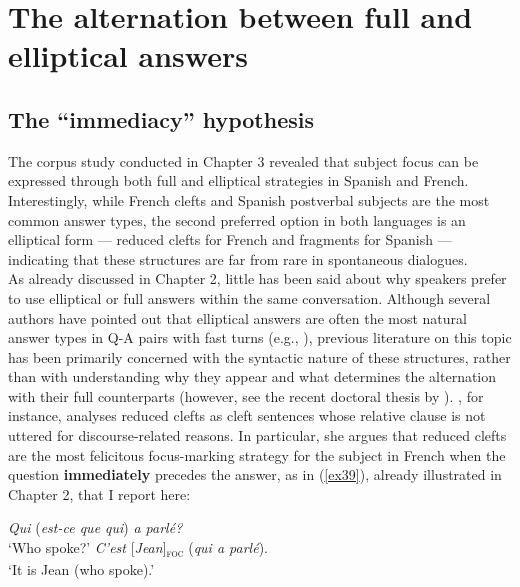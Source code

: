 
\chapter{The alternation between full and elliptical answers}\label{sec:4}

\section{The ``immediacy” hypothesis} 

The corpus study conducted in Chapter 3 revealed that subject focus can be expressed through both full and elliptical strategies in Spanish and French. Interestingly, while French clefts and Spanish postverbal subjects are the most common answer types, the second preferred option in both languages is an elliptical form — reduced clefts for French and fragments for Spanish — indicating that these structures are far from rare in spontaneous dialogues. \\
As already discussed in Chapter 2, little has been said about why speakers prefer to use elliptical or full answers within the same conversation. 
Although several authors have pointed out that elliptical answers are often the most natural answer types in Q-A pairs with fast turns (e.g., \cite{belletti2005answering, belletti2008answering, lahousse2012word, vidal2019nota}), previous literature on this topic has been primarily concerned with the syntactic nature of these  structures, rather than with understanding why they appear and what determines the alternation with their full counterparts (however, see the recent doctoral thesis by \cite{bourgoin2022corpus}). 
\textcite{belletti2008cp}, for instance, analyses reduced clefts as cleft sentences whose relative clause is not uttered for discourse-related reasons. In particular, she argues that reduced clefts are the most felicitous focus-marking strategy for the subject in French when the question \textbf{immediately} precedes the answer, as in (\ref{ex39}), already illustrated in Chapter 2, that I report here:

\begin{exe}
	 \label{ex62}
	\begin{xlist}
		\ex \textit{Qui} (\textit{est-ce que qui}) \textit{a parlé?}\\
		`Who spoke?'
		\ex \textit{C'est} {[\textit{Jean}]\textsubscript{\textsc{foc}}} \normalsize(\textit{qui a parlé}).\\
		`It is Jean (who spoke).' \hfill \parencite[192]{belletti2008cp}   
	\end{xlist}
\end{exe} 


